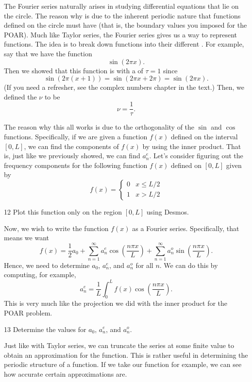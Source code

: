 \documentclass{article}
\begin{document}
The Fourier series naturally arises in studying differential equations that lie on the circle.  The reason why is due to the inherent periodic nature that functions defined on the circle must have (that is, the boundary values you imposed for the POAR).  Much like Taylor series, the Fourier series gives us a way to represent functions.  The idea is to break down functions into their different .  For example, say that we have the function
\[
\sin(2\pi x).
\]
Then we showed that this function is  with a  of $\tau=1$ since
\[
\sin(2\pi (x+1))=\sin(2\pi x + 2\pi)=\sin(2\pi x).
\]
(If you need a refresher, see the complex numbers chapter in the text.) Then, we defined the  $\nu$ to be
\[
\nu = \frac{1}{\tau}.
\]

The reason why this all works is due to the orthogonality of the $\sin$ and $\cos$ functions. Specifically, if we are given a function $f(x)$ defined on the interval $[0,L]$, we can find the components of $f(x)$ by using the inner product. That is, just like we previously showed, we can find $a_n^e$. Let's consider figuring out the frequency components for the following function $f(x)$ defined on $[0,L]$ given by
\[
f(x) = \begin{cases} 0 & x\leq L/2\\
1 & x>L/2 \end{cases}
\]

\begin{problem}{}{12}
Plot this function only on the region $[0,L]$ using Desmos.
\end{problem}

\noindent Now, we wish to write the function $f(x)$ as a Fourier series. Specifically, that means we want
\[
f(x) = \frac{1}{2}a_0 +\sum_{n=1}^\infty a_n^e \cos\left( \frac{n\pi x}{L}\right)+\sum_{n=1}^\infty a_n^o \sin\left( \frac{n\pi x}{L}\right).
\]
Hence, we need to determine $a_0$, $a_n^e$, and $a_n^o$ for all $n$. We can do this by computing, for example,
\[
a_n^e = \frac{1}{L}\int_0^L f(x) \cos\left(\frac{n\pi x}{L}\right).
\]
This is very much like the projection we did with the inner product for the POAR problem.

\begin{problem}{}{13}
Determine the values for $a_0$, $a_n^e$, and $a_n^o$.
\end{problem}

Just like with Taylor series, we can truncate the series at some finite value to obtain an approximation for the function.  This is rather useful in determining the periodic structure of a function.  If we take our function for example, we can see how accurate certain approximations are.
\end{document}
